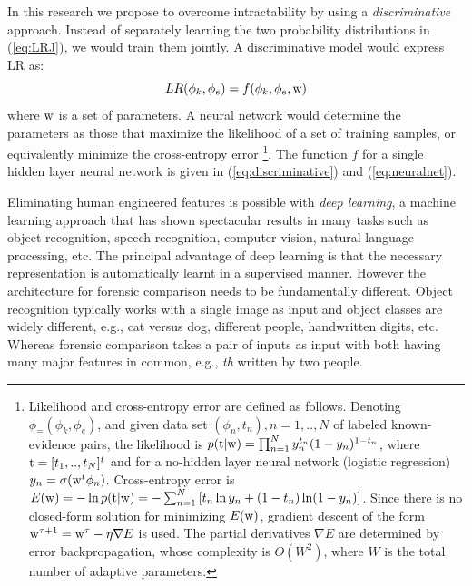 \documentclass[11pt, doublespacing]{article}
\begin{document}
In this research we propose to  overcome  intractability  by using a {\em discriminative} approach. Instead of separately learning the two probability distributions in (\ref{eq:LRJ}), we would train them jointly.  A discriminative model would express LR as:
\begin{equation}
LR(\phi_{k},\phi_{e})=f(\phi_{k}, \phi_{e}, {\boldmath {\mathrm w}})
\end{equation}
where $\boldmath {\mathrm w}$ is a set of parameters. A neural network would determine the parameters as those  that maximize the likelihood of a set of training samples, or equivalently minimize the cross-entropy error
\footnote{ Likelihood and cross-entropy error are defined as follows. Denoting  $\phi_=(\phi_{k},\phi_{e})$, and given data set $(\phi_{n},t_{n}), n=1,..,N$ of labeled known-evidence pairs,  the likelihood is $p({\boldmath \mathrm {t|w}})=\prod_{n=1}^{N}y_{n}^{t_{n}}(1-y_{n})^{1-t_{n}}$, where ${\boldmath \mathrm t}=[t_{1},..,t_{N}]^t$ and for a no-hidden layer neural network (logistic regression)  $y_{n}=\sigma ({\boldmath \mathrm w}^{t}\phi_{n})$. Cross-entropy error is $E({\boldmath \mathrm w})=-\ln p({\boldmath \mathrm {t|w}} )=-\sum_{n=1}^{N}  \left[ t_{n}\ln y_{n}+(1-t_{n})\ln(1-y_{n})\right]$. Since there is no closed-form solution for minimizing $E({\boldmath \mathrm w})$, gradient descent of the form ${\boldmath {\mathrm w}}^{\tau +1}={\boldmath {\mathrm w}}^{\tau }-\eta \nabla E$ is used. The partial derivatives $\nabla E$  are determined by error backpropagation, whose complexity is $O(W^{2})$, where $W$ is the total number of adaptive parameters.}.
The function $f$ for a single hidden layer neural network is given in (\ref{eq:discriminative}) and (\ref{eq:neuralnet}).

Eliminating human engineered features is possible with {\em deep learning}, a machine learning approach that has shown spectacular results in many tasks such as object recognition,  speech recognition, computer vision, natural language processing, etc. 
The principal advantage of deep learning is that the necessary representation is automatically learnt in a supervised manner.  
However the architecture for forensic comparison needs to be fundamentally different.  Object recognition typically works with a single image as input and object classes are widely different, e.g., cat versus dog, different people, handwritten digits, etc. Whereas forensic comparison takes a pair of inputs as input with both having many major features in common, e.g., {\em th} written by two people.
\end{document}
